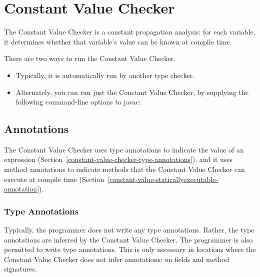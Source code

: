 \htmlhr
\chapter{Constant Value Checker\label{constant-value-checker}}

The Constant Value Checker is a constant propagation analysis: for
each variable, it determines whether that variable's value can be
known at compile time.

There are two ways to run the Constant Value Checker.
\begin{itemize}
\item
Typically, it is automatically run by another type checker.
\item
Alternately, you can run just the Constant Value Checker, by
supplying the following command-line options to javac:
\end{itemize}

\section{Annotations\label{constant-value-checker-annotations}}

The Constant Value Checker uses type annotations to indicate the value of
an expression (Section~\ref{constant-value-checker-type-annotations}), and
it uses method annotations to indicate methods that the Constant Value
Checker can execute at compile time
(Section~\ref{constant-value-staticallyexecutable-annotation}).


\subsection{Type Annotations\label{constant-value-checker-type-annotations}}

Typically, the programmer does not write any type annotations.  Rather, the
type annotations are inferred by the Constant Value Checker.
The programmer is also permitted to write type annotations.  This is only necessary in
locations where the Constant Value Checker does not infer annotations:  on fields
and method signatures.


